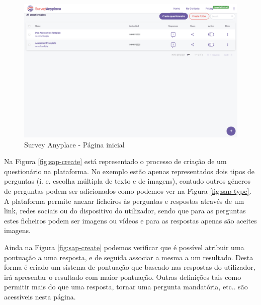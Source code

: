 \begin{figure}[ht!]
	\begin{center}
		\includegraphics[width=1\textwidth]{img/sap/dash}
		\caption{Survey Anyplace - Página inicial}
		\label{fig:sap-dash}
	\end{center}
\end{figure}

Na Figura \ref{fig:sap-create} está representado o processo de criação de um questionário na plataforma. No exemplo estão apenas representados dois tipos de perguntas (i. e. escolha múltipla de texto e de imagens), contudo outros géneros de perguntas podem ser adicionados como podemos ver na Figura \ref{fig:sap-type}. A plataforma permite anexar ficheiros às perguntas e respostas através de um link, redes sociais ou do dispositivo do utilizador, sendo que para as perguntas estes ficheiros podem ser imagens ou vídeos e para as respostas apenas são aceites imagens.

Ainda na Figura \ref{fig:sap-create} podemos verificar que é possível atribuir uma pontuação a uma resposta, e de seguida associar a mesma a um resultado. Desta forma é criado um sistema de pontuação que baseado nas respostas do utilizador, irá apresentar o resultado com maior pontuação. Outras definições tais como permitir mais do que uma resposta, tornar uma pergunta mandatória, etc.. são acessíveis nesta página.

\newpage

